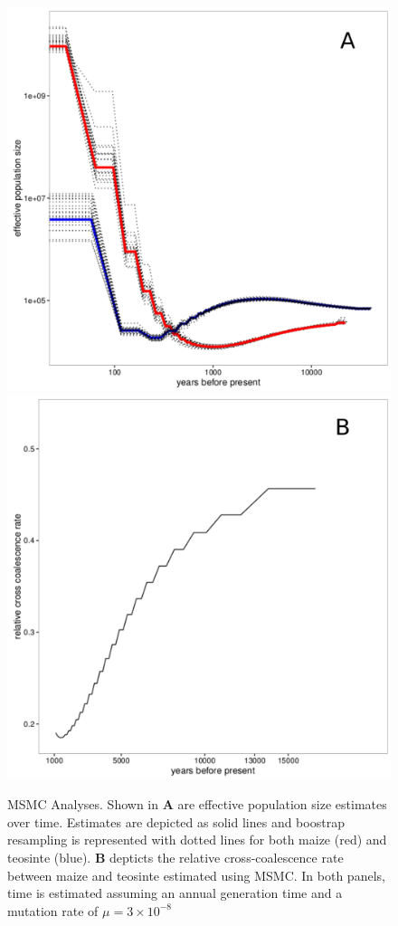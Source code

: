 \documentclass[12pt,a4paper]{article}
\begin{document}
\begin{figure}
  \includegraphics[width=.5\textwidth]{FigsAndFiles/TIL_BKN_bootstrapping_msmc2_labeled.pdf}
  \includegraphics[width=.5\textwidth]{FigsAndFiles/relativeCrossCoalescenceRate_labeled.pdf}
\caption{MSMC Analyses. Shown in \textbf{A} are effective population size estimates over time. Estimates are depicted as solid lines and boostrap resampling is represented with dotted lines for both maize (red) and teosinte (blue). \textbf{B} depticts the relative cross-coalescence rate between maize and teosinte estimated using MSMC. In both panels, time is estimated assuming an annual generation time and a mutation rate of $\mu=3\times 10^{-8}$ \label{sFig:msmc}}
\end{figure}
\clearpage
\end{document}

